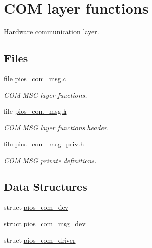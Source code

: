 \hypertarget{group___p_i_o_s___c_o_m}{\section{C\-O\-M layer functions}
\label{group___p_i_o_s___c_o_m}
}


Hardware communication layer.  


\subsection*{Files}
\begin{DoxyCompactItemize}
\item 
file \hyperlink{pios__com__msg_8c}{pios\-\_\-com\-\_\-msg.\-c}
\begin{DoxyCompactList}\small\item\em C\-O\-M M\-S\-G layer functions. \end{DoxyCompactList}\item 
file \hyperlink{pios__com__msg_8h}{pios\-\_\-com\-\_\-msg.\-h}
\begin{DoxyCompactList}\small\item\em C\-O\-M M\-S\-G layer functions header. \end{DoxyCompactList}\item 
file \hyperlink{pios__com__msg__priv_8h}{pios\-\_\-com\-\_\-msg\-\_\-priv.\-h}
\begin{DoxyCompactList}\small\item\em C\-O\-M M\-S\-G private definitions. \end{DoxyCompactList}\end{DoxyCompactItemize}
\subsection*{Data Structures}
\begin{DoxyCompactItemize}
\item 
struct \hyperlink{structpios__com__dev}{pios\-\_\-com\-\_\-dev}
\item 
struct \hyperlink{structpios__com__msg__dev}{pios\-\_\-com\-\_\-msg\-\_\-dev}
\item 
struct \hyperlink{structpios__com__driver}{pios\-\_\-com\-\_\-driver}
\end{DoxyCompactItemize}
